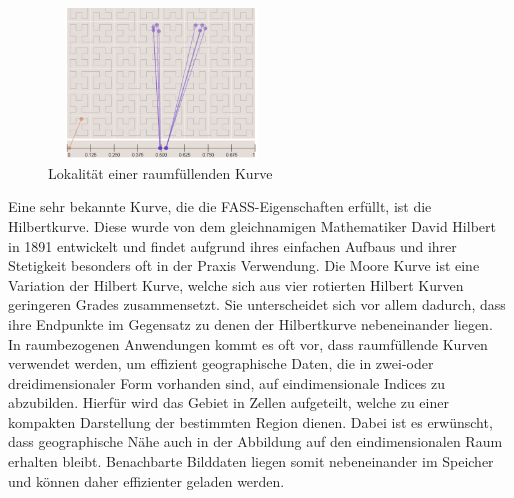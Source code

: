 \documentclass[course=erap]{aspdoc}
\begin{document}
\begin{figure}[h]
\centering
      \includegraphics[width=6cm, height=4cm]{Locality}
    \caption{Lokalität einer raumfüllenden Kurve \cite{pic:locality}}
    \label{fig:locality}
\end{figure}

Eine sehr bekannte Kurve, die die FASS-Eigenschaften erfüllt, ist die Hilbertkurve. Diese wurde von dem gleichnamigen Mathematiker David Hilbert in 1891 entwickelt und findet aufgrund ihres einfachen Aufbaus und ihrer Stetigkeit besonders oft in der Praxis Verwendung.
\newline
Die Moore Kurve ist eine Variation der Hilbert Kurve, welche sich aus vier rotierten Hilbert Kurven geringeren Grades zusammensetzt. Sie unterscheidet sich vor allem dadurch, dass ihre Endpunkte im Gegensatz zu denen der Hilbertkurve nebeneinander liegen.
\\
In raumbezogenen Anwendungen kommt es oft vor, dass raumfüllende Kurven verwendet werden, um effizient geographische Daten, die in zwei-oder dreidimensionaler Form vorhanden sind, auf eindimensionale Indices zu abzubilden. Hierfür wird das Gebiet in Zellen aufgeteilt, welche zu einer kompakten Darstellung der bestimmten Region dienen. Dabei ist es erwünscht, dass geographische Nähe auch in der Abbildung auf den eindimensionalen Raum erhalten bleibt. Benachbarte Bilddaten liegen somit nebeneinander im Speicher und können daher effizienter geladen werden.
\end{document}
